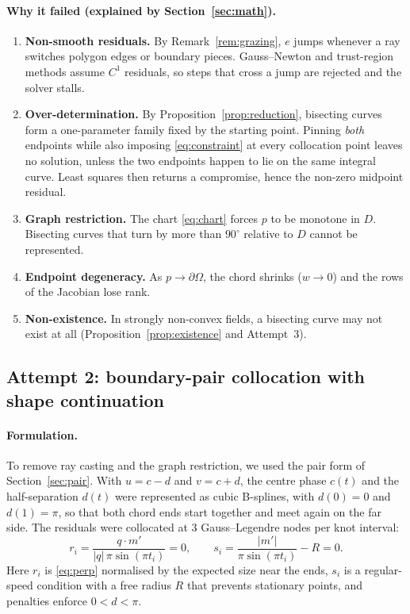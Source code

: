 \documentclass[11pt,a4paper]{article}
\numberwithin{equation}{section}
\theoremstyle{plain}
\theoremstyle{definition}
\theoremstyle{remark}
\newcommand{\pO}{\partial\Omega}
\begin{document}
\paragraph{Why it failed (explained by Section~\ref{sec:math}).}
\begin{enumerate}
  \item \textbf{Non-smooth residuals.} By Remark~\ref{rem:grazing}, $e$ jumps whenever a ray switches polygon edges or boundary pieces. Gauss--Newton and trust-region methods assume $C^1$ residuals, so steps that cross a jump are rejected and the solver stalls.
  \item \textbf{Over-determination.} By Proposition~\ref{prop:reduction}, bisecting curves form a one-parameter family fixed by the starting point. Pinning \emph{both} endpoints while also imposing \eqref{eq:constraint} at every collocation point leaves no solution, unless the two endpoints happen to lie on the same integral curve. Least squares then returns a compromise, hence the non-zero midpoint residual.
  \item \textbf{Graph restriction.} The chart \eqref{eq:chart} forces $p$ to be monotone in $D$. Bisecting curves that turn by more than $90^\circ$ relative to $D$ cannot be represented.
  \item \textbf{Endpoint degeneracy.} As $p\to\pO$, the chord shrinks ($w\to0$) and the rows of the Jacobian lose rank.
  \item \textbf{Non-existence.} In strongly non-convex fields, a bisecting curve may not exist at all (Proposition~\ref{prop:existence} and Attempt~3).
\end{enumerate}

\subsection{Attempt 2: boundary-pair collocation with shape continuation}

\paragraph{Formulation.} To remove ray casting and the graph restriction, we used the pair form of Section~\ref{sec:pair}. With $u=c-d$ and $v=c+d$, the centre phase $c(t)$ and the half-separation $d(t)$ were represented as cubic B-splines, with $d(0)=0$ and $d(1)=\pi$, so that both chord ends start together and meet again on the far side. The residuals were collocated at 3 Gauss--Legendre nodes per knot interval:
\begin{equation}
r_i=\frac{q\cdot m'}{|q|\,\pi\sin(\pi t_i)}=0,\qquad
s_i=\frac{|m'|}{\pi\sin(\pi t_i)}-R=0 .
\label{eq:attempt2}
\end{equation}
Here $r_i$ is \eqref{eq:perp} normalised by the expected size near the ends, $s_i$ is a regular-speed condition with a free radius $R$ that prevents stationary points, and penalties enforce $0<d<\pi$.
\end{document}
